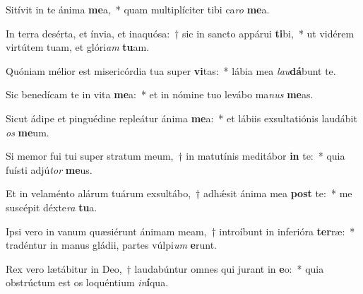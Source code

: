 \item Sitívit in te ánima \textbf{me}a,~* quam multiplíciter tibi ca\textit{ro} \textbf{me}a.
\item In terra desérta, et ínvia, et inaquósa:~† sic in sancto appárui \textbf{ti}bi,~* ut vidérem virtútem tuam, et glóri\textit{am} \textbf{tu}am.
\item Quóniam mélior est misericórdia tua super \textbf{vi}tas:~* lábia mea \textit{lau}\textbf{dá}bunt te.
\item Sic benedícam te in vita \textbf{me}a:~* et in nómine tuo levábo ma\textit{nus} \textbf{me}as.
\item Sicut ádipe et pinguédine repleátur ánima \textbf{me}a:~* et lábiis exsultatiónis laudábit \textit{os} \textbf{me}um.
\item Si memor fui tui super stratum meum,~† in matutínis meditábor \textbf{in} te:~* quia fuísti adjú\textit{tor} \textbf{me}us.
\item Et in velaménto alárum tuárum exsultábo,~† adhǽsit ánima mea \textbf{post} te:~* me suscépit déxte\textit{ra} \textbf{tu}a.
\item Ipsi vero in vanum quæsiérunt ánimam meam,~† introíbunt in inferióra \textbf{ter}ræ:~* tradéntur in manus gládii, partes vúlpi\textit{um} \textbf{e}runt.
\item Rex vero lætábitur in Deo,~† laudabúntur omnes qui jurant in \textbf{e}o:~* quia obstrúctum est os loquéntium \textit{in}\textbf{í}qua.
